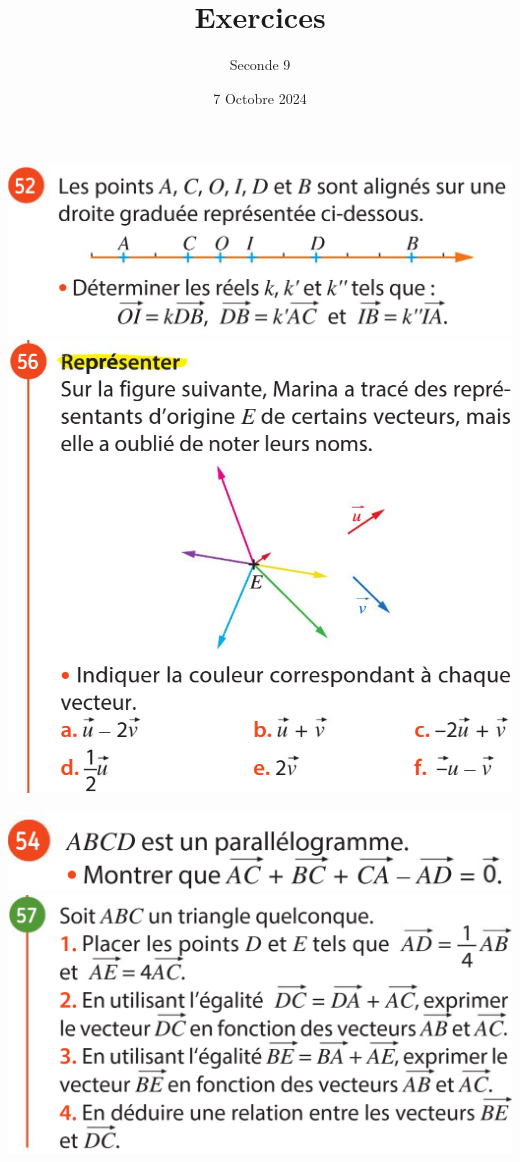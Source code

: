 \documentclass{article}
\title{Exercices}
\date{7 Octobre 2024}
\author{Seconde 9}
\begin{document}
\maketitle

\begin{center}
\includegraphics[width=\textwidth]{DroiteGraduee.png}
\includegraphics[width=\textwidth]{Couleurs.png}
\end{center}

\newpage
\begin{center}
\includegraphics[width=\textwidth]{Parallelogramme.png}
\includegraphics[width=\textwidth]{DernierExo.png}
\end{center}
\end{document}

